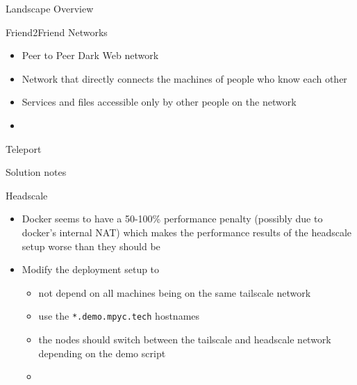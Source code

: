 \begin{frame}[fragile]{Landscape Overview}
\begin{block}{Friend2Friend Networks}
\protect\hypertarget{friend2friend-networks}{}
\begin{itemize}
\tightlist
\item
  Peer to Peer Dark Web network
\item
  Network that directly connects the machines of people who know each
  other
\item
  Services and files accessible only by other people on the network
\item
\end{itemize}
\end{block}

\begin{block}{Teleport}
\protect\hypertarget{teleport}{}
\end{block}
\end{frame}

\begin{frame}[fragile]{Solution notes}
\protect\hypertarget{solution-notes}{}
\begin{block}{Headscale}
\protect\hypertarget{headscale}{}
\begin{itemize}
\tightlist
\item
  Docker seems to have a 50-100\% performance penalty (possibly due to
  docker's internal NAT) which makes the performance results of the
  headscale setup worse than they should be
\item
  Modify the deployment setup to

  \begin{itemize}
  \tightlist
  \item
    not depend on all machines being on the same tailscale network
  \item
    use the \texttt{*.demo.mpyc.tech} hostnames
  \item
    the nodes should switch between the tailscale and headscale network
    depending on the demo script
  \item
  \end{itemize}
\end{itemize}
\end{block}
\end{frame}


